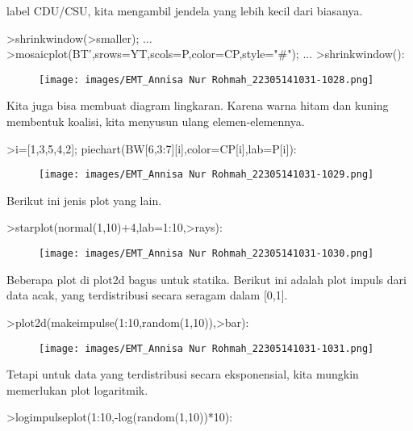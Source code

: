 \documentclass[a4paper,10pt]{article}
\begin{document}
\begin{eulernotebook}
\begin{eulercomment}
\begin{eulercomment}
\begin{eulercomment}
\begin{eulercomment}
\begin{eulercomment}
label CDU/CSU, kita mengambil jendela yang lebih kecil dari biasanya.
\end{eulercomment}
\begin{eulerprompt}
>shrinkwindow(>smaller);  ...
>mosaicplot(BT',srows=YT,scols=P,color=CP,style="#"); ...
>shrinkwindow():
\end{eulerprompt}
\begin{figure}[h]
    \centering
    \texttt{[image: images/EMT\_Annisa Nur Rohmah\_22305141031-1028.png]}
\end{figure}
\begin{eulercomment}
Kita juga bisa membuat diagram lingkaran. Karena warna hitam dan
kuning membentuk koalisi, kita menyusun ulang elemen-elemennya.
\end{eulercomment}
\begin{eulerprompt}
>i=[1,3,5,4,2]; piechart(BW[6,3:7][i],color=CP[i],lab=P[i]):
\end{eulerprompt}
\begin{figure}[h]
    \centering
    \texttt{[image: images/EMT\_Annisa Nur Rohmah\_22305141031-1029.png]}
\end{figure}
\begin{eulercomment}
Berikut ini jenis plot yang lain.
\end{eulercomment}
\begin{eulerprompt}
>starplot(normal(1,10)+4,lab=1:10,>rays):
\end{eulerprompt}
\begin{figure}[h]
    \centering
    \texttt{[image: images/EMT\_Annisa Nur Rohmah\_22305141031-1030.png]}
\end{figure}
\begin{eulercomment}
Beberapa plot di plot2d bagus untuk statika. Berikut ini adalah plot
impuls dari data acak, yang terdistribusi secara seragam dalam [0,1].
\end{eulercomment}
\begin{eulerprompt}
>plot2d(makeimpulse(1:10,random(1,10)),>bar):
\end{eulerprompt}
\begin{figure}[h]
    \centering
    \texttt{[image: images/EMT\_Annisa Nur Rohmah\_22305141031-1031.png]}
\end{figure}
\begin{eulercomment}
Tetapi untuk data yang terdistribusi secara eksponensial, kita mungkin
memerlukan plot logaritmik.
\end{eulercomment}
\begin{eulerprompt}
>logimpulseplot(1:10,-log(random(1,10))*10):

\end{eulerprompt}
\end{eulercomment}
\end{eulercomment}
\end{eulercomment}
\end{eulercomment}
\end{eulernotebook}
\end{document}
